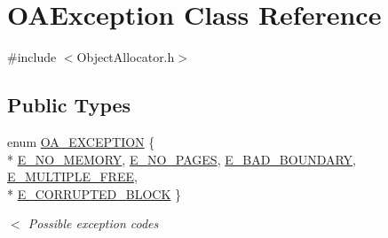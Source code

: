 \hypertarget{classOAException}{\section{O\-A\-Exception Class Reference}
\label{classOAException}
}


{\ttfamily \#include $<$Object\-Allocator.\-h$>$}

\subsection*{Public Types}
\begin{DoxyCompactItemize}
\item 
enum \hyperlink{classOAException_a7b7c4b5031a4f065e894d02ac7c97a32}{O\-A\-\_\-\-E\-X\-C\-E\-P\-T\-I\-O\-N} \{ \\*
\hyperlink{classOAException_a7b7c4b5031a4f065e894d02ac7c97a32ae18f5cbb3503fde484739545afcc9161}{E\-\_\-\-N\-O\-\_\-\-M\-E\-M\-O\-R\-Y}, 
\hyperlink{classOAException_a7b7c4b5031a4f065e894d02ac7c97a32a00b488cc53e8fb49d4b2dd75291b7f82}{E\-\_\-\-N\-O\-\_\-\-P\-A\-G\-E\-S}, 
\hyperlink{classOAException_a7b7c4b5031a4f065e894d02ac7c97a32a8c562017500215f88c804392775c6b1b}{E\-\_\-\-B\-A\-D\-\_\-\-B\-O\-U\-N\-D\-A\-R\-Y}, 
\hyperlink{classOAException_a7b7c4b5031a4f065e894d02ac7c97a32a2123fdbb5bd50beb07f893ac38688bce}{E\-\_\-\-M\-U\-L\-T\-I\-P\-L\-E\-\_\-\-F\-R\-E\-E}, 
\\*
\hyperlink{classOAException_a7b7c4b5031a4f065e894d02ac7c97a32ae4bfdc0e26752fbd32d5fdfe183e52c0}{E\-\_\-\-C\-O\-R\-R\-U\-P\-T\-E\-D\-\_\-\-B\-L\-O\-C\-K}
 \}
\begin{DoxyCompactList}\small\item\em $<$ Possible exception codes \end{DoxyCompactList}\end{DoxyCompactItemize}
